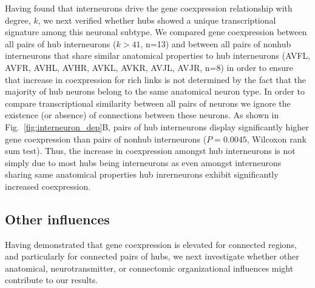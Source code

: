 \documentclass[10pt,letterpaper]{article}
\begin{document}
Having found that interneurons drive the gene coexpression relationship with degree, $k$, we next verified whether hubs showed a unique transcriptional signature among this neuronal subtype.
We compared gene coexpression between all pairs of hub interneurons ($\textit{k}>41$, n=13) and between all pairs of nonhub interneurons that share similar anatomical properties to hub interneurons (AVFL, AVFR, AVHL, AVHR, AVKL, AVKR, AVJL, AVJR, n=8) in order to ensure that increase in coexpression for rich links is not determined by the fact that the majority of hub neurons belong to the same anatomical neuron type. 
In order to compare transcriptional similarity between all pairs of neurons we ignore the existence (or absence) of connections between these neurons.  
As shown in Fig.~\ref{fig:interneuron_dep}B, pairs of hub interneurons display significantly higher gene coexpression than pairs of nonhub interneurons ($P = 0.0045$, Wilcoxon rank sum test).
Thus, the increase in coexpression amongst hub interneurons is not simply due to most hubs being interneurons as even amongst interneurons sharing same anatomical properties hub inrerneurons exhibit significantly increased coexpression.

\subsection*{Other influences}
Having demonstrated that gene coexpression is elevated for connected regions, and particularly for connected pairs of hubs, we next investigate whether other anatomical, neurotransmitter, or connectomic organizational influences might contribute to our results.

\end{document}
